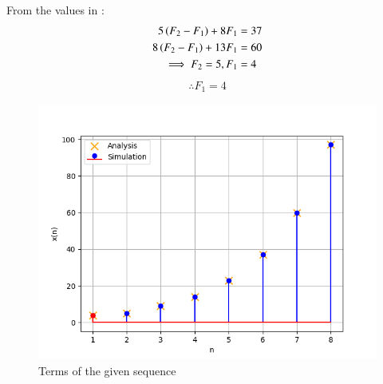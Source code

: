 \documentclass[journal,12pt]{IEEEtran}
\begin{document}
	From the values in :
	\begin{align}
		5 \left(F_2-F_1\right) + 8 F_1 &=37\\
		8 \left(F_2-F_1\right) + 13 F_1 &=60\\
		\implies F_2 =5, F_1 &=4
	\end{align}
	\begin{align}
		\therefore {F_1=4}
	\end{align}
	\begin{figure}[ht]
		\includegraphics[width = \columnwidth]{figs/fig4}
		\caption{Terms of the given sequence}
		\centering
		\label{fig: fig4}
	\end{figure}
\end{document}
